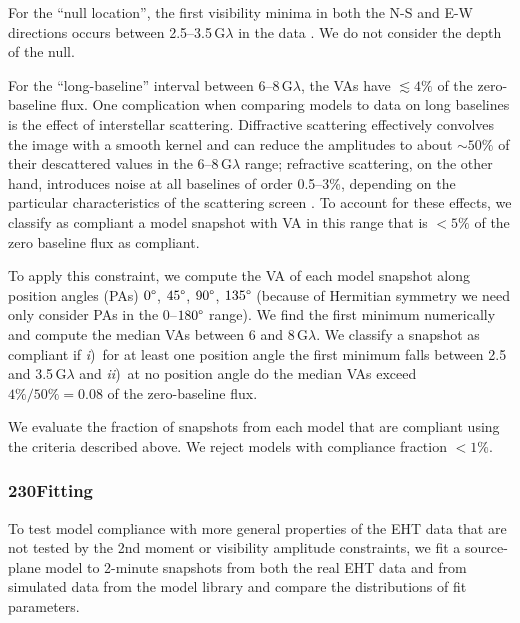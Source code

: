 For the ``null location'', the first visibility minima in both the N-S
and E-W directions occurs between 2.5--3.5\,$\mathrm{G}\lambda$ in the
data .
We do not consider the depth of the null.

For the ``long-baseline'' interval between 6--8\,$\mathrm{G}\lambda$,
the VAs have $\lesssim 4\%$ of the zero-baseline flux.
One complication when comparing models to data on long baselines is
the effect of interstellar scattering.
Diffractive scattering effectively convolves the image with a smooth
kernel and can reduce the amplitudes to about $\sim 50\%$ of their
descattered values in the 6--8\,$\mathrm{G}\lambda$ range; refractive
scattering, on the other hand, introduces noise at all baselines of
order 0.5--3\%, depending on the particular characteristics of the
scattering screen \citep{2018arXiv180501242P, 2018ApJ...865..104J}.
To account for these effects, we classify as compliant a model
snapshot with VA in this range that is $< 5\%$ of the zero baseline
flux as compliant.

To apply this constraint, we compute the VA of each model snapshot
along position angles (PAs) $0\degree$, $45\degree$, $90\degree$,
$135\degree$ (because of Hermitian symmetry we need only consider PAs
in the 0--$180\degree$ range).
We find the first minimum numerically and compute the median VAs
between 6 and 8\,$\mathrm{G}\lambda$.
We classify a snapshot as compliant if
\emph{i})~for at least one position angle the first minimum falls
between 2.5 and 3.5\,$\mathrm{G}\lambda$ and
\emph{ii})~at no position angle do the median VAs exceed $4\% / 50\% =
0.08$ of the zero-baseline flux.

We evaluate the fraction of snapshots from each model that are
compliant using the criteria described above.
We reject models with compliance fraction $< 1\%$.

\subsubsection{230\GHz \Mring Fitting}

To test model compliance with more general properties of the EHT data that are not tested by the 2nd moment or visibility amplitude constraints, we fit a source-plane model to 2-minute snapshots from both the real EHT data and from simulated data from the model library and compare the distributions of fit parameters.

